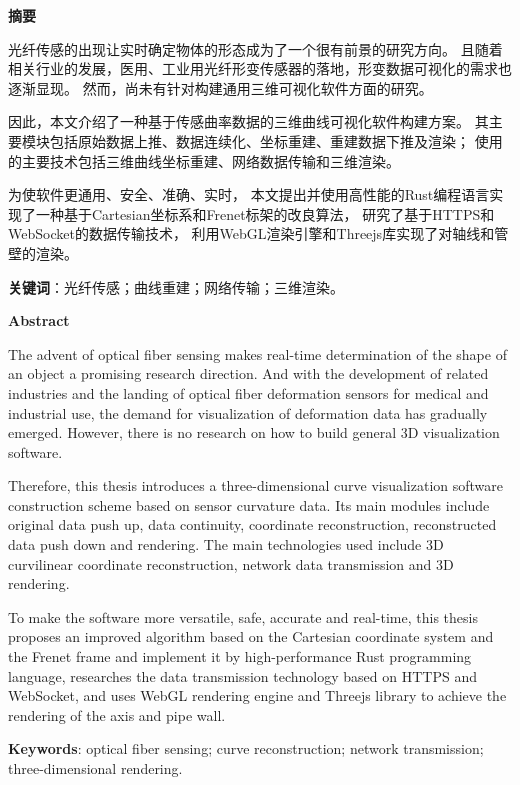 \begin{center}
    \bfseries {} 摘要
\end{center}

光纤传感的出现让实时确定物体的形态成为了一个很有前景的研究方向。
且随着相关行业的发展，医用、工业用光纤形变传感器的落地，形变数据可视化的需求也逐渐显现。
然而，尚未有针对构建通用三维可视化软件方面的研究。

因此，本文介绍了一种基于传感曲率数据的三维曲线可视化软件构建方案。
其主要模块包括原始数据上推、数据连续化、坐标重建、重建数据下推及渲染；
使用的主要技术包括三维曲线坐标重建、网络数据传输和三维渲染。

为使软件更通用、安全、准确、实时，
本文提出并使用高性能的Rust编程语言实现了一种基于Cartesian坐标系和Frenet标架的改良算法，
研究了基于HTTPS和WebSocket的数据传输技术，
利用WebGL渲染引擎和Threejs库实现了对轴线和管壁的渲染。

\textbf{关键词}：光纤传感；曲线重建；网络传输；三维渲染。

\cleardoublepage

\begin{center}
    \bfseries {} Abstract
\end{center}

The advent of optical fiber sensing makes real-time determination of the shape of an object a promising research direction.
And with the development of related industries and the landing of optical fiber deformation sensors for medical and industrial use, the demand for visualization of deformation data has gradually emerged.
However, there is no research on how to build general 3D visualization software.

Therefore, this thesis introduces a three-dimensional curve visualization software construction scheme based on sensor curvature data.
Its main modules include original data push up, data continuity, coordinate reconstruction, reconstructed data push down and rendering.
The main technologies used include 3D curvilinear coordinate reconstruction, network data transmission and 3D rendering.

To make the software more versatile, safe, accurate and real-time,
this thesis proposes an improved algorithm based on the Cartesian coordinate system and the Frenet frame and implement it by high-performance Rust programming language,
researches the data transmission technology based on HTTPS and WebSocket,
and uses WebGL rendering engine and Threejs library to achieve the rendering of the axis and pipe wall.

\textbf{Keywords}: optical fiber sensing; curve reconstruction; network transmission; three-dimensional rendering.